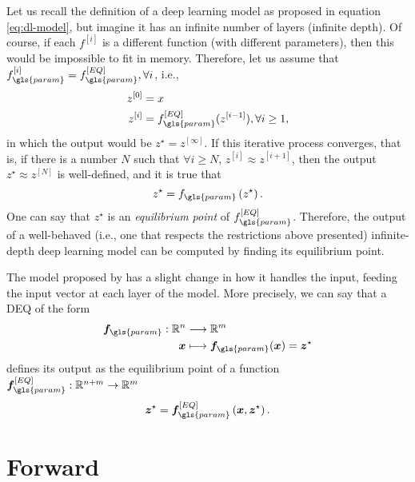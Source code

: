 Let us recall the definition of a deep learning model as proposed in equation \eqref{eq:dl-model}, but imagine it has an infinite number of layers (infinite depth).
Of course, if each $f^{[i]}$ is a different function (with different parameters), then this would be impossible to fit in memory.
Therefore, let us assume that $f_{\gls{param}}^{[i]}=f_{\gls{param}}^{[EQ]},\forall i$, i.e.,
\begin{equation*}
\begin{split}
    z^{[0]} &= x \\
    z^{[i]} &= f_{\gls{param}}^{[EQ]}(z^{[i-1]}), \forall i\ge 1
,\end{split}
\end{equation*}
in which the output would be $z^{\star} = z^{[\infty]}$.
If this iterative process converges, that is, if there is a number $N$ such that $\forall i\ge N,\,z^{[i]}\approx z^{[i+1]}$, then the output $z^{\star}\approx z^{[N]}$ is well-defined, and it is true that  \[
    z^{\star} = f_{\gls{param}}\left( z^{\star} \right) 
.\] 
One can say that $z^{\star}$ is an \emph{equilibrium point} of $f_{\gls{param}}^{[EQ]}$.
Therefore, the output of a well-behaved (i.e., one that respects the restrictions above presented) infinite-depth deep learning model can be computed by finding its equilibrium point.

The model proposed by \textcite{Bai2019} has a slight change in how it handles the input, feeding the input vector at each layer of the model. More precisely, we can say that a \gls{DEQ} of the form
\begin{align*}
    \bm{f}_{\gls{param}}: \R^{n} &\longrightarrow \R^{m} \\
    \bm{x} &\longmapsto \bm{f}_{\gls{param}}(\bm{x}) = \bm{z}^{\star}
\end{align*}
defines its output as the equilibrium point of a function $\bm{f}_{\gls{param}}^{[EQ]}:\R^{n+m}\to \R^{m}$
\begin{equation}\label{eq:z-star}
    \bm{z}^{\star} = \bm{f}_{\gls{param}}^{[EQ]}\left( \bm{x},\bm{z}^{\star} \right) 
.\end{equation}

\section{Forward}

